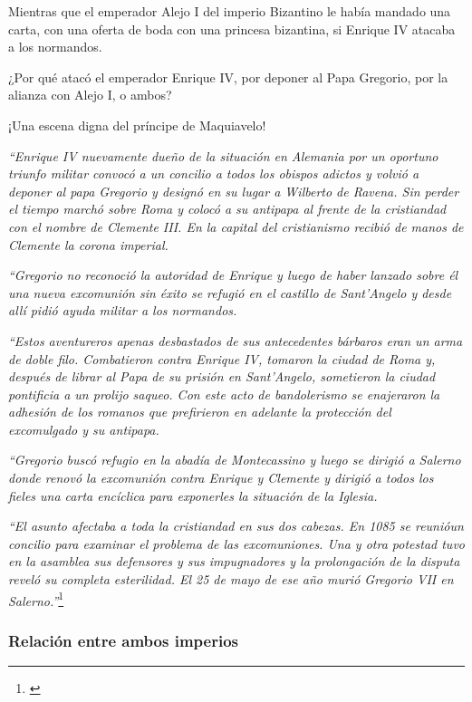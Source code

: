Mientras que el emperador Alejo I del imperio Bizantino le había mandado
una carta, con una oferta de boda con una princesa bizantina,
si Enrique IV atacaba a los normandos.

¿Por qué atacó el emperador Enrique IV, por deponer al Papa Gregorio,
por la alianza con Alejo I, o ambos?

¡Una escena digna del príncipe de Maquiavelo!

\textit{
	``Enrique IV nuevamente dueño de la situación en Alemania por
	un oportuno triunfo militar convocó a un concilio a todos
	los obispos adictos y volvió a deponer al papa Gregorio
	y designó en su lugar a Wilberto de Ravena. Sin perder
	el tiempo marchó sobre Roma y colocó a su antipapa al frente
	de la cristiandad con el nombre de Clemente III.
	En la capital del cristianismo recibió de manos de Clemente
	la corona imperial.
}

\textit{
	``Gregorio no reconoció la autoridad de Enrique y luego
	de haber lanzado sobre él una nueva excomunión sin éxito
	se refugió en el castillo de Sant'Angelo y desde allí
	pidió ayuda militar a los normandos.
}

\textit{
	``Estos aventureros apenas desbastados de sus antecedentes
	bárbaros eran un arma de doble filo. Combatieron contra
	Enrique IV, tomaron la ciudad de Roma y, después de librar
	al Papa de su prisión en Sant'Angelo, sometieron la ciudad
	pontificia a un prolijo saqueo. Con este acto de bandolerismo
	se enajeraron la adhesión de los romanos que prefirieron
	en adelante la protección del excomulgado y su antipapa.
}

\textit{
	``Gregorio buscó refugio en la abadía de Montecassino y luego
	se dirigió a Salerno donde renovó la excomunión contra
	Enrique y Clemente y dirigió a todos los fieles una carta
	encíclica para exponerles la situación de la Iglesia.
}

\textit{
	``El asunto afectaba a toda la cristiandad en sus dos cabezas.
	En 1085 se reunióun concilio para examinar el problema
	de las excomuniones. Una y otra potestad tuvo en la
	asamblea sus defensores y sus impugnadores y la prolongación
	de la disputa reveló su completa esterilidad. El 25 de mayo de
	ese año murió Gregorio VII en Salerno.''}\footnote{\cite[p.~871--872]{ciudad}}

\subsubsection{Relación entre ambos imperios}

